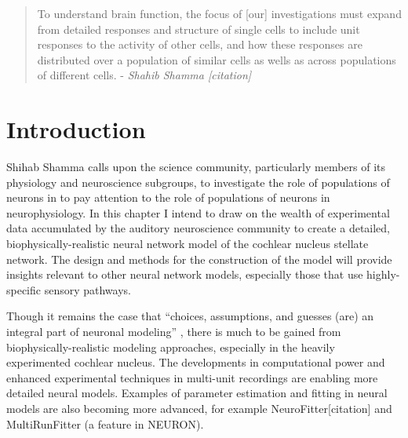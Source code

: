  

\begin{quotation}
  To understand brain function, the focus of [our] investigations must
  expand from detailed responses and structure of single cells to
  include unit responses to the activity of other cells, and how these
  responses are distributed over a population of similar cells as
  wells as across populations of different cells.  - \emph{Shahib Shamma [citation]}
\citet{Shamma:1998}
\end{quotation}




\section{Introduction}

Shihab Shamma calls upon the science community, particularly members
of its physiology and neuroscience subgroups, to investigate the role
of populations of neurons in to pay attention to the role of
populations of neurons in neurophysiology. In this chapter I intend to draw on the wealth of experimental data
accumulated by the auditory neuroscience community to create a
detailed, biophysically-realistic neural network model of the cochlear
nucleus stellate network.  The design and methods for the construction
of the model will provide insights relevant to other neural network
models, especially those that use highly-specific sensory pathways.

Though it remains the case that ``choices, assumptions, and guesses
(are) an integral part of neuronal modeling''
\citep{SegevBurkeEtAl:1998}, there is much to be gained from
biophysically-realistic modeling approaches, especially in the heavily
experimented cochlear nucleus. The developments in computational power
and enhanced experimental techniques in multi-unit recordings are
enabling more detailed neural models. Examples of parameter estimation
and fitting in neural models are also becoming more advanced, for
example NeuroFitter[citation] and MultiRunFitter (a feature in
NEURON).  

\medskip{}


